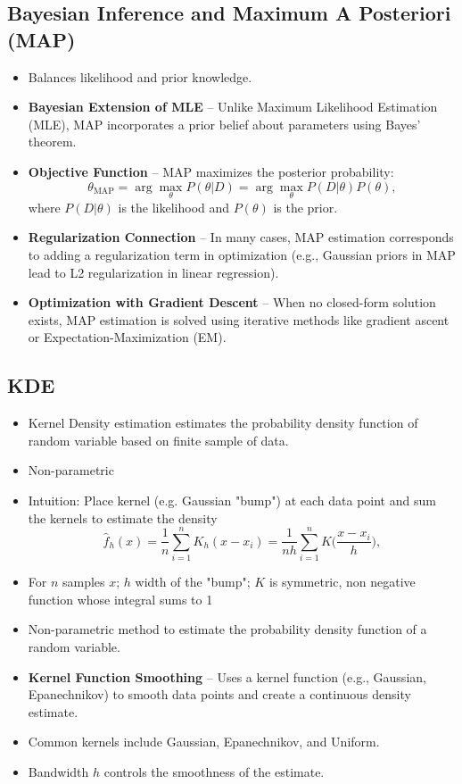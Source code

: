 \documentclass[12pt,a4paper]{article}
\begin{document}
\subsection{Bayesian Inference and Maximum A Posteriori (MAP)}
\begin{itemize}
    \item Balances likelihood and prior knowledge.
       \item \textbf{Bayesian Extension of MLE} – Unlike Maximum Likelihood Estimation (MLE), MAP incorporates a prior belief about parameters using Bayes’ theorem.
    
    \item \textbf{Objective Function} – MAP maximizes the posterior probability:
    \[
    \theta_{\text{MAP}} = \arg\max_{\theta} P(\theta | D) = \arg\max_{\theta} P(D | \theta) P(\theta),
    \]
    where \( P(D | \theta) \) is the likelihood and \( P(\theta) \) is the prior.
    
    \item \textbf{Regularization Connection} – In many cases, MAP estimation corresponds to adding a regularization term in optimization (e.g., Gaussian priors in MAP lead to L2 regularization in linear regression).
    
    \item \textbf{Optimization with Gradient Descent} – When no closed-form solution exists, MAP estimation is solved using iterative methods like gradient ascent or Expectation-Maximization (EM).

\end{itemize}

\subsection{KDE}
\begin{itemize}
    \item Kernel Density estimation estimates the probability density function of random variable based on finite sample of data. 
    \item Non-parametric

    \item Intuition: Place kernel (e.g. Gaussian "bump") at each data point and sum the kernels to estimate the density
    \[{\displaystyle {\widehat {f}}_{h}(x)={\frac {1}{n}}\sum _{i=1}^{n}K_{h}(x-x_{i})={\frac {1}{nh}}\sum _{i=1}^{n}K{\Big (}{\frac {x-x_{i}}{h}}{\Big )},}\]
    \item For $n$ samples $x$; $h$ width of the "bump"; $K$ is symmetric, non negative function whose integral sums to 1
    \item Non-parametric method to estimate the probability density function of a random variable.
    \item \textbf{Kernel Function Smoothing} – Uses a kernel function (e.g., Gaussian, Epanechnikov) to smooth data points and create a continuous density estimate.
    \item Common kernels include Gaussian, Epanechnikov, and Uniform.
    \item Bandwidth $h$ controls the smoothness of the estimate.
\end{itemize}
\end{document}
